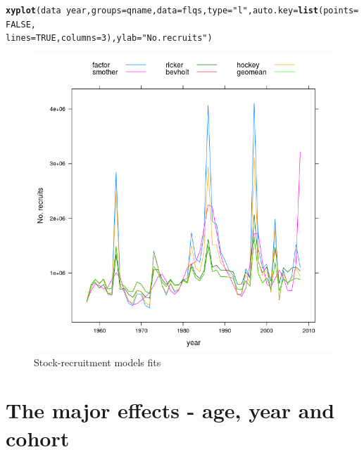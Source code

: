 \documentclass[a4paper,english,10pt]{article}\usepackage[]{graphicx}\usepackage[]{color}
\makeatletter
\def\maxwidth{ %
  \ifdim\Gin@nat@width>\linewidth
    \linewidth
  \else
    \Gin@nat@width
  \fi
}
\newcommand{\hlnum}[1]{\textcolor[rgb]{0.686,0.059,0.569}{#1}}%
\newcommand{\hlstr}[1]{\textcolor[rgb]{0.192,0.494,0.8}{#1}}%
\newcommand{\hlopt}[1]{\textcolor[rgb]{0,0,0}{#1}}%
\newcommand{\hlstd}[1]{\textcolor[rgb]{0.345,0.345,0.345}{#1}}%
\newcommand{\hlkwc}[1]{\textcolor[rgb]{0.333,0.667,0.333}{#1}}%
\newcommand{\hlkwd}[1]{\textcolor[rgb]{0.737,0.353,0.396}{\textbf{#1}}}%
\newenvironment{kframe}{%
 \def\at@end@of@kframe{}%
 \ifinner\ifhmode%
  \def\at@end@of@kframe{\end{minipage}}%
  \begin{minipage}{\columnwidth}%
 \fi\fi%
 \def\FrameCommand##1{\hskip\@totalleftmargin \hskip-\fboxsep
 \colorbox{shadecolor}{##1}\hskip-\fboxsep
     \hskip-\linewidth \hskip-\@totalleftmargin \hskip\columnwidth}%
 \MakeFramed {\advance\hsize-\width
   \@totalleftmargin\z@ \linewidth\hsize
   \@setminipage}}%
 {\par\unskip\endMakeFramed%
 \at@end@of@kframe}
\newenvironment{knitrout}{}{} %
\makeatother
\begin{document}
\begin{knitrout}
\color{fgcolor}\begin{kframe}
\begin{alltt}
\hlkwd{xyplot}\hlstd{(data} \hlopt{~} \hlstd{year,} \hlkwc{groups} \hlstd{= qname,} \hlkwc{data} \hlstd{= flqs,} \hlkwc{type} \hlstd{=} \hlstr{"l"}\hlstd{,} \hlkwc{auto.key} \hlstd{=} \hlkwd{list}\hlstd{(}\hlkwc{points} \hlstd{=} \hlnum{FALSE}\hlstd{,}
    \hlkwc{lines} \hlstd{=} \hlnum{TRUE}\hlstd{,} \hlkwc{columns} \hlstd{=} \hlnum{3}\hlstd{),} \hlkwc{ylab} \hlstd{=} \hlstr{"No. recruits"}\hlstd{)}
\end{alltt}
\end{kframe}\begin{figure}[H]

{\centering \includegraphics[width=\maxwidth]{figure/srmod-1} 

}

\caption[Stock-recruitment models fits]{Stock-recruitment models fits}\label{fig:srmod}
\end{figure}


\end{knitrout}

\section{The major effects - age, year and cohort}
\end{document}
